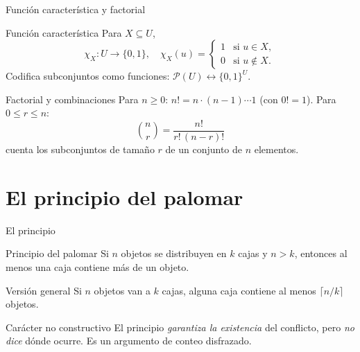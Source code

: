\documentclass[10pt,xcolor=dvipsnames]{beamer}
\begin{document}
\begin{frame}{Función característica y factorial}
  \begin{block}{Función característica}
    Para $X \subseteq U$,
    \[
      \chi_X : U \to \{0,1\}, \quad
      \chi_X(u) = \begin{cases} 1 & \text{si } u \in X, \\ 0 & \text{si } u \notin X. \end{cases}
    \]
    Codifica subconjuntos como funciones: $\mathcal{P}(U) \leftrightarrow \{0,1\}^U$.
  \end{block}

  \begin{block}{Factorial y combinaciones}
    Para $n \geq 0$: $n! = n \cdot (n-1) \cdots 1$ (con $0! = 1$).
    Para $0 \leq r \leq n$:
    \[
      \binom{n}{r} = \frac{n!}{r!\,(n-r)!}
    \]
    cuenta los subconjuntos de tamaño $r$ de un conjunto de $n$ elementos.
  \end{block}
\end{frame}





\section{El principio del palomar}

\begin{frame}{El principio}
  \begin{block}{Principio del palomar}
    Si $n$ objetos se distribuyen en $k$ cajas y $n > k$, entonces
    \alert{al menos una caja contiene más de un objeto}.
  \end{block}

  \begin{block}{Versión general}
    Si $n$ objetos van a $k$ cajas, alguna caja contiene al menos
    $\lceil n/k \rceil$ objetos.
  \end{block}

  \begin{alertblock}{Carácter no constructivo}
    El principio \emph{garantiza la existencia} del conflicto, pero
    \emph{no dice} dónde ocurre. Es un argumento de conteo disfrazado.
  \end{alertblock}
\end{frame}
\end{document}
